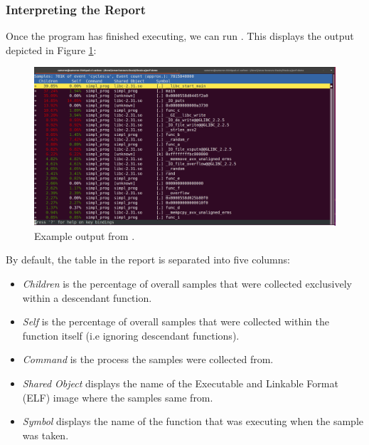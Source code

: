\subsubsection{Interpreting the Report}

Once the program has finished executing, we can run . This displays the output depicted in Figure \ref{fig:perf_report_output}:

\begin{figure}[h!]
    \includegraphics[width=\linewidth]{thesis-a_perf_report}
    \caption{Example output from .}
    \label{fig:perf_report_output}
\end{figure}

By default, the table in the report is separated into five columns:

\ssp
\begin{itemize}
    \item \textit{Children} is the percentage of overall samples that were collected exclusively within a descendant function.
    \item \textit{Self} is the percentage of overall samples that were collected within the function itself (i.e ignoring descendant functions).
    \item \textit{Command} is the process the samples were collected from.
    \item \textit{Shared Object} displays the name of the Executable and Linkable Format (ELF) image where the samples same from.
    \item \textit{Symbol} displays the name of the function that was executing when the sample was taken.
\end{itemize}
\dsp

